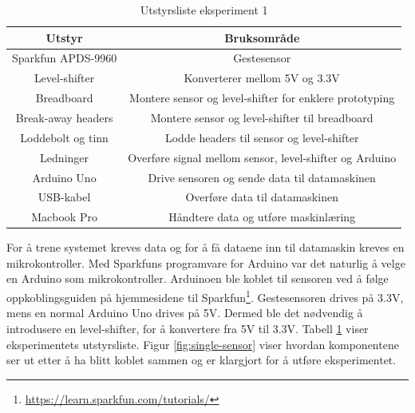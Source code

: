 \begin{table}[h!]
\caption{Utstyrsliste eksperiment 1}
\centering
\begin{tabular}{|| c c ||}
\hline
 Utstyr & Bruksområde \\
 \hline\hline
 Sparkfun APDS-9960 & Gestesensor \\ 
 \hline
 Level-shifter & Konverterer mellom 5V og 3.3V \\
 \hline
 Breadboard & Montere sensor og level-shifter for enklere prototyping \\ 
 \hline
 Break-away headers & Montere sensor og level-shifter til breadboard   \\ 
 \hline
 Loddebolt og tinn & Lodde headers til sensor og level-shifter\\
 \hline
 Ledninger & Overføre signal mellom sensor, level-shifter og Arduino \\
 \hline
 Arduino Uno & Drive sensoren og sende data til datamaskinen\\
 \hline
 USB-kabel & Overføre data til datamaskinen \\
 \hline
 Macbook Pro & Håndtere data og utføre maskinlæring\\
 \hline
\end{tabular}
\label{table:utstyrsliste}
\end{table}
For å trene systemet kreves data og for å få dataene inn til datamaskin kreves en mikrokontroller. Med Sparkfuns programvare for Arduino var det naturlig å velge en Arduino som mikrokontroller. Arduinoen ble koblet til sensoren ved å følge oppkoblingsguiden på hjemmesidene til Sparkfun\footnote{\url{https://learn.sparkfun.com/tutorials/}}. Gestesensoren drives på 3.3V, mens en normal Arduino Uno drives på 5V. Dermed ble det nødvendig å introdusere en level-shifter, for å konvertere fra 5V til 3.3V. Tabell \ref{table:utstyrsliste} viser eksperimentets utstyrsliste. Figur \ref{fig:single-sensor} viser hvordan komponentene ser ut etter å ha blitt koblet sammen og er klargjort for å utføre eksperimentet.

